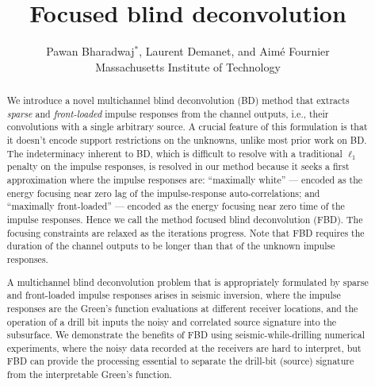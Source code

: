\documentclass{article}
\title{Focused blind deconvolution}
\author{Pawan Bharadwaj$^*$,
Laurent Demanet,
and
Aim{\'e} Fournier \\ Massachusetts Institute of Technology}
\theoremstyle{definition}
\begin{document}
\maketitle

\begin{abstract}
	We introduce a novel multichannel blind deconvolution (BD)
	method
	that
	extracts \emph{sparse} and \emph{front-loaded} impulse responses from the channel outputs, i.e., 
	their convolutions with a single arbitrary source.
	A crucial feature of this formulation 
	is that it 
	doesn't encode support restrictions on the unknowns, unlike most prior work on BD.
	The indeterminacy inherent to BD, 
	which is difficult to resolve with a traditional 
	$\ell_1$ penalty on the impulse responses,
	is resolved in our method because it seeks
	a first approximation
	where the impulse responses are:
	``maximally white{''} --- encoded as the energy focusing near zero lag of the
		impulse-response auto-correlations; and 
		``maximally front-loaded{''} --- encoded as the energy focusing near zero time 
		of the impulse responses.
	Hence we call the method
	focused
	blind deconvolution
	(FBD).
	The focusing constraints 
	are relaxed as the iterations progress.
	Note that FBD
	requires %
	the  
	duration
	of the channel outputs to be 
	longer than that of the unknown impulse responses.

	A multichannel blind deconvolution 
	problem that is appropriately formulated by sparse and front-loaded impulse responses 
	arises in seismic inversion, where the impulse responses 
	are 
	the Green's function evaluations at different receiver locations, 
	and the operation of a drill bit inputs the %
	noisy and correlated source signature into the 
	subsurface.
	We demonstrate the benefits of FBD 
	using 
	seismic-while-drilling
	numerical 
	experiments, where
	the noisy data recorded at the receivers 
	are hard to interpret,
	but FBD can provide the processing essential to 
	separate
	the drill-bit (source) signature 
	from the interpretable Green's function.




	



\end{abstract}
\end{document}
